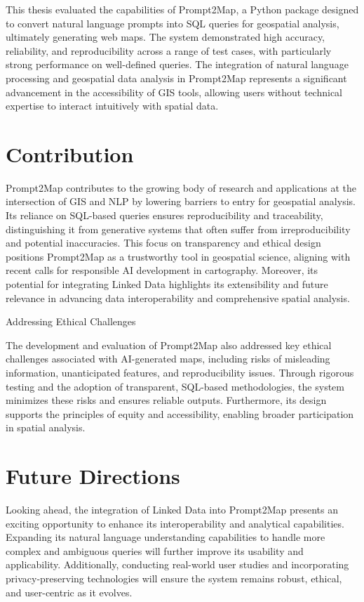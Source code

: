 This thesis evaluated the capabilities of Prompt2Map, a Python package designed to convert natural language prompts into SQL queries for geospatial analysis, ultimately generating web maps. The system demonstrated high accuracy, reliability, and reproducibility across a range of test cases, with particularly strong performance on well-defined queries. The integration of natural language processing and geospatial data analysis in Prompt2Map represents a significant advancement in the accessibility of GIS tools, allowing users without technical expertise to interact intuitively with spatial data.

\section{Contribution}

Prompt2Map contributes to the growing body of research and applications at the intersection of GIS and NLP by lowering barriers to entry for geospatial analysis. Its reliance on SQL-based queries ensures reproducibility and traceability, distinguishing it from generative systems that often suffer from irreproducibility and potential inaccuracies. This focus on transparency and ethical design positions Prompt2Map as a trustworthy tool in geospatial science, aligning with recent calls for responsible AI development in cartography. Moreover, its potential for integrating Linked Data highlights its extensibility and future relevance in advancing data interoperability and comprehensive spatial analysis.

Addressing Ethical Challenges

The development and evaluation of Prompt2Map also addressed key ethical challenges associated with AI-generated maps, including risks of misleading information, unanticipated features, and reproducibility issues. Through rigorous testing and the adoption of transparent, SQL-based methodologies, the system minimizes these risks and ensures reliable outputs. Furthermore, its design supports the principles of equity and accessibility, enabling broader participation in spatial analysis.

\section{Future Directions}

Looking ahead, the integration of Linked Data into Prompt2Map presents an exciting opportunity to enhance its interoperability and analytical capabilities. Expanding its natural language understanding capabilities to handle more complex and ambiguous queries will further improve its usability and applicability. Additionally, conducting real-world user studies and incorporating privacy-preserving technologies will ensure the system remains robust, ethical, and user-centric as it evolves.


